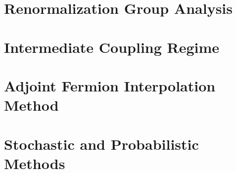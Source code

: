 \documentclass[11pt,a4paper]{report}
\begin{document}
\chapter{Renormalization Group Analysis}
\label{ch:rg-analysis}





\chapter{Intermediate Coupling Regime}
\label{ch:intermediate}





\chapter{Adjoint Fermion Interpolation Method}
\label{ch:adjoint}






\chapter{Stochastic and Probabilistic Methods}
\label{ch:stochastic}




\end{document}
